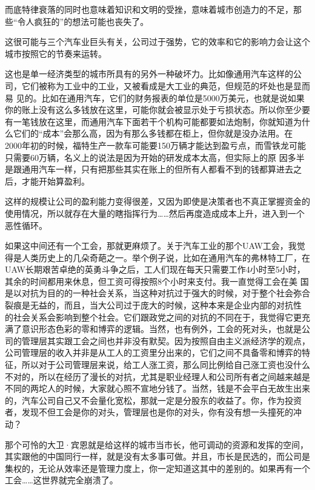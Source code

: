 而底特律衰落的同时也意味着知识和文明的受挫，意味着城市创造力的不足，那些``令人疯狂的''的想法可能也丧失了。

这很可能与三个汽车业巨头有关，公司过于强势，它的效率和它的影响力会让这个城市按照它的节奏来运转。

这也是单一经济类型的城市所具有的另外一种破坏力。比如像通用汽车这样的公司，它们被称为工业中的工业，又被看成是大工业的典范，但规范的坏处也是显而易
见的。比如在通用汽车，它们的财务报表的单位是5000万美元，也就是说如果你的账上没有这么多钱放在这里，可能你就会被显示处于亏损状态。所以你至少要
有一笔钱放在这里，而通用汽车下面若干个机构可能都要如法炮制，你就知道为什么它们的``成本''会那么高，因为有那么多钱都在柜上，但你就是没办法用。在
2000年初的时候，福特生产一款车可能要150万辆才能达到盈亏点，而雪铁龙可能只需要60万辆，名义上的说法是因为开始的研发成本太高，但实际上的原
因多半是跟通用汽车一样，只有把那些其实在账上的但所有人都看不到的钱都算进去之后，才能开始算盈利。

这样的规模让公司的盈利能力变得很差，又因为即使是决策者也不真正掌握资金的使用情况，所以就存在大量的瞎指挥行为\ldots\ldots 然后再度造成成本上升，进入到一个恶性循环。

如果这中间还有一个工会，那就更麻烦了。关于汽车工业的那个UAW工会，我觉得是人类历史上的几朵奇葩之一。举个例子说，比如在通用汽车的弗林特工厂，在
UAW长期艰苦卓绝的英勇斗争之后，工人们现在每天只需要工作4小时至5小时，其余的时间都用来休息，但工资可得按照8个小时来支付。我一直觉得工会在美
国是以对抗为目的的一种社会关系，当这种对抗过于强大的时候，对于整个社会弥合裂痕是无益的，而且，当大公司过于庞大的时候，这种本来是企业内部的对抗性
的社会关系会影响到整个社会。它们跟政党之间的对抗的不同在于，我觉得它更充满了意识形态色彩的零和博弈的逻辑。当然，也有例外，工会的死对头，也就是公
司的管理层其实跟工会之间也并非没有默契。因为按照自由主义派经济学的观点，公司管理层的收入并非是从工人的工资里分出来的，它们之间不具备零和博弈的特
征，所以对于公司管理层来说，给工人涨工资，那么同比例给自己涨工资也没什么不对的，所以在经历了漫长的对抗，尤其是职业经理人和公司所有者之间越来越是
不同的两坨人的时候，大家就心照不宣地分钱了。当然，钱是不会平白无故生出来的，汽车公司自己又不会量化宽松，那就一定是分股东的收益了。你，作为投资
者，发现不但工会是你的对头，管理层也是你的对头，你有没有想一头撞死的冲动？

那个可怜的大卫·宾恩就是给这样的城市当市长，他可调动的资源和发挥的空间，其实跟他的中国同行一样，就是没有太多事可做。并且，市长是民选的，而公司是集权的，无论从效率还是管理力度上，你一定知道这其中的差别的。如果再有一个工会\ldots\ldots 这世界就完全崩溃了。

